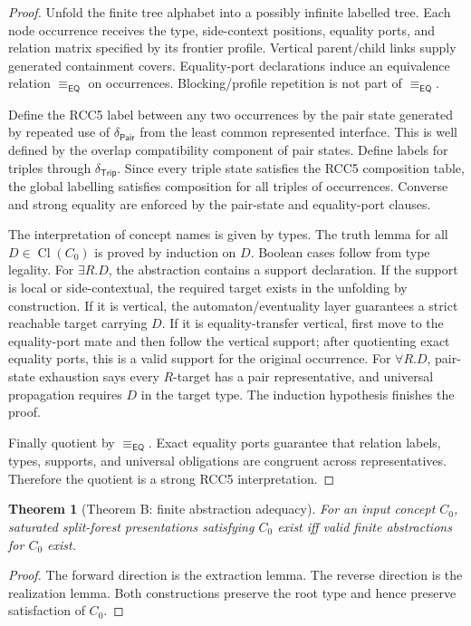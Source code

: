 \documentclass[11pt]{article}
\newtheorem{theorem}{Theorem}[section]
\newcommand{\EQ}{\mathsf{EQ}}
\newcommand{\Cl}{\operatorname{Cl}}
\newcommand{\Pair}{\mathsf{Pair}}
\newcommand{\Trip}{\mathsf{Trip}}
\newcommand{\eqE}{\equiv_{\EQ}}
\begin{document}
\begin{proof}
Unfold the finite tree alphabet into a possibly infinite labelled tree.  Each node occurrence receives the type, side-context positions, equality ports, and relation matrix specified by its frontier profile.  Vertical parent/child links supply generated containment covers.  Equality-port declarations induce an equivalence relation $\eqE$ on occurrences.  Blocking/profile repetition is not part of $\eqE$.

Define the RCC5 label between any two occurrences by the pair state generated by repeated use of $\delta_{\Pair}$ from the least common represented interface.  This is well defined by the overlap compatibility component of pair states.  Define labels for triples through $\delta_{\Trip}$.  Since every triple state satisfies the RCC5 composition table, the global labelling satisfies composition for all triples of occurrences.  Converse and strong equality are enforced by the pair-state and equality-port clauses.

The interpretation of concept names is given by types.  The truth lemma for all $D\in\Cl(C_0)$ is proved by induction on $D$.  Boolean cases follow from type legality.  For $\exists R.D$, the abstraction contains a support declaration.  If the support is local or side-contextual, the required target exists in the unfolding by construction.  If it is vertical, the automaton/eventuality layer guarantees a strict reachable target carrying $D$.  If it is equality-transfer vertical, first move to the equality-port mate and then follow the vertical support; after quotienting exact equality ports, this is a valid support for the original occurrence.  For $\forall R.D$, pair-state exhaustion says every $R$-target has a pair representative, and universal propagation requires $D$ in the target type.  The induction hypothesis finishes the proof.

Finally quotient by $\eqE$.  Exact equality ports guarantee that relation labels, types, supports, and universal obligations are congruent across representatives.  Therefore the quotient is a strong RCC5 interpretation.
\end{proof}

\begin{theorem}[Theorem B: finite abstraction adequacy]
For an input concept $C_0$, saturated split-forest presentations satisfying $C_0$ exist iff valid finite abstractions for $C_0$ exist.
\end{theorem}

\begin{proof}
The forward direction is the extraction lemma.  The reverse direction is the realization lemma.  Both constructions preserve the root type and hence preserve satisfaction of $C_0$.
\end{proof}
\end{document}
